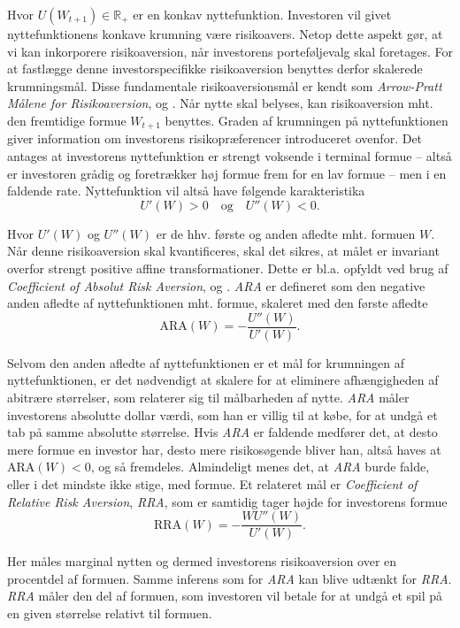\documentclass[
  a4paper,
  oneside]{memoir}
\begin{document}
Hvor \(U(W_{t+1})\in\mathbb{R}_+\) er en konkav nyttefunktion. Investoren vil givet nyttefunktionens konkave krumning være risikoavers. Netop dette aspekt gør, at vi kan inkorporere risikoaversion, når investorens porteføljevalg skal foretages. For at fastlægge denne investorspecifikke risikoaversion benyttes derfor skalerede krumningsmål. Disse fundamentale risikoaversionsmål er kendt som \emph{Arrow-Pratt Målene for Risikoaversion}, \citep{Arrow1965} og \citep{Pratt1964}. Når nytte skal belyses, kan risikoaversion mht. den fremtidige formue \(W_{t+1}\) benyttes. Graden af krumningen på nyttefunktionen giver information om investorens risikopræferencer introduceret ovenfor. Det antages at investorens nyttefunktion er strengt voksende i terminal formue -- altså er investoren grådig og foretrækker høj formue frem for en lav formue -- men i en faldende rate. Nyttefunktion vil altså have følgende karakteristika
\[U'(W)>0\quad\text{og}\quad U''(W)<0.\]

Hvor \(U'(W)\) og \(U''(W)\) er de hhv. første og anden afledte mht. formuen \(W\). Når denne risikoaversion skal kvantificeres, skal det sikres, at målet er invariant overfor strengt positive affine transformationer. Dette er bl.a. opfyldt ved brug af \emph{Coefficient of Absolut Risk Aversion}, \citep{Arrow1965} og \citep{Pratt1964}. \emph{ARA} er defineret som den negative anden afledte af nyttefunktionen mht. formue, skaleret med den første afledte
\[\text{ARA}(W)=-\frac{U''(W)}{U'(W)}.\]

Selvom den anden afledte af nyttefunktionen er et mål for krumningen af nyttefunktionen, er det nødvendigt at skalere for at eliminere afhængigheden af abitrære størrelser, som relaterer sig til målbarheden af nytte. \emph{ARA} måler investorens absolutte dollar værdi, som han er villig til at købe, for at undgå et tab på samme absolutte størrelse. Hvis \emph{ARA} er faldende medfører det, at desto mere formue en investor har, desto mere risikosøgende bliver han, altså haves at \(\text{ARA}(W)<0\), og så fremdeles. Almindeligt menes det, at \emph{ARA} burde falde, eller i det mindste ikke stige, med formue. Et relateret mål er \emph{Coefficient of Relative Risk Aversion}, \emph{RRA}, som er samtidig tager højde for investorens formue
\[\text{RRA}(W)=-\frac{WU''(W)}{U'(W)}.\]

Her måles marginal nytten og dermed investorens risikoaversion over en procentdel af formuen. Samme inferens som for \emph{ARA} kan blive udtænkt for \emph{RRA}. \emph{RRA} måler den del af formuen, som investoren vil betale for at undgå et spil på en given størrelse relativt til formuen.
\end{document}
